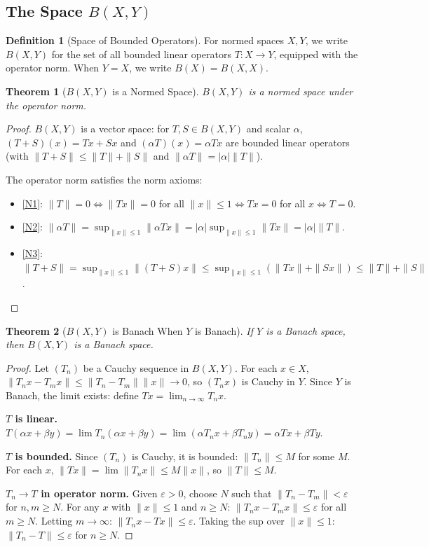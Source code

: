 \documentclass[11pt,a4paper]{article}
\theoremstyle{definition}
\newtheorem{definition}{Definition}[section]
\theoremstyle{plain}
\newtheorem{theorem}{Theorem}[section]
\theoremstyle{remark}
\begin{document}
\subsection{The Space $B(X,Y)$}

\begin{definition}[Space of Bounded Operators]
\label{def:BXY}
For normed spaces $X, Y$, we write $B(X,Y)$ for the set of all bounded linear
operators $T \colon X \to Y$, equipped with the operator norm. When $Y = X$, we
write $B(X) = B(X,X)$.
\end{definition}

\begin{theorem}[$B(X,Y)$ is a Normed Space]
\label{thm:BXY_normed}
$B(X,Y)$ is a normed space under the operator norm.
\end{theorem}

\begin{proof}
$B(X,Y)$ is a vector space: for $T, S \in B(X,Y)$ and scalar $\alpha$,
$(T + S)(x) = Tx + Sx$ and $(\alpha T)(x) = \alpha Tx$ are bounded linear operators
(with $\|T + S\| \le \|T\| + \|S\|$ and $\|\alpha T\| = |\alpha| \|T\|$).

The operator norm satisfies the norm axioms:
\begin{itemize}[nosep]
\item \ref{N1}: $\|T\| = 0 \iff \|Tx\| = 0$ for all $\|x\| \le 1 \iff Tx = 0$
for all $x \iff T = 0$.
\item \ref{N2}: $\|\alpha T\| = \sup_{\|x\| \le 1} \|\alpha Tx\| =
|\alpha| \sup_{\|x\| \le 1} \|Tx\| = |\alpha| \|T\|$.
\item \ref{N3}: $\|T + S\| = \sup_{\|x\| \le 1} \|(T+S)x\| \le
\sup_{\|x\| \le 1} (\|Tx\| + \|Sx\|) \le \|T\| + \|S\|$.
\end{itemize}
\end{proof}

\begin{theorem}[$B(X,Y)$ is Banach When $Y$ is Banach]
\label{thm:BXY_banach}
If $Y$ is a Banach space, then $B(X,Y)$ is a Banach space.
\end{theorem}

\begin{proof}
Let $(T_n)$ be a Cauchy sequence in $B(X,Y)$. For each $x \in X$,
$\|T_n x - T_m x\| \le \|T_n - T_m\| \|x\| \to 0$, so $(T_n x)$ is Cauchy in $Y$.
Since $Y$ is Banach, the limit exists: define $Tx = \lim_{n \to \infty} T_n x$.

\textbf{$T$ is linear.} $T(\alpha x + \beta y) = \lim T_n(\alpha x + \beta y) =
\lim (\alpha T_n x + \beta T_n y) = \alpha Tx + \beta Ty$.

\textbf{$T$ is bounded.} Since $(T_n)$ is Cauchy, it is bounded: $\|T_n\| \le M$
for some $M$. For each $x$, $\|Tx\| = \lim \|T_n x\| \le M \|x\|$, so
$\|T\| \le M$.

\textbf{$T_n \to T$ in operator norm.} Given $\varepsilon > 0$, choose $N$ such
that $\|T_n - T_m\| < \varepsilon$ for $n, m \ge N$. For any $x$ with $\|x\| \le 1$
and $n \ge N$:
$\|T_n x - T_m x\| \le \varepsilon$ for all $m \ge N$. Letting $m \to \infty$:
$\|T_n x - Tx\| \le \varepsilon$. Taking the sup over $\|x\| \le 1$:
$\|T_n - T\| \le \varepsilon$ for $n \ge N$.
\end{proof}
\end{document}
